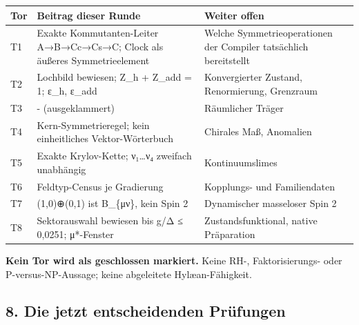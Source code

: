 {\def\LTcaptype{none} %
\begin{longtable}[]{@{}
  >{\raggedright\arraybackslash}p{}
  >{\raggedright\arraybackslash}p{}
  >{\raggedright\arraybackslash}p{}@{}}
\toprule\noalign{}
\begin{minipage}[b]{\linewidth}\raggedright
Tor
\end{minipage} & \begin{minipage}[b]{\linewidth}\raggedright
Beitrag dieser Runde
\end{minipage} & \begin{minipage}[b]{\linewidth}\raggedright
Weiter offen
\end{minipage} \\
\midrule\noalign{}
\endhead
\bottomrule\noalign{}
\endlastfoot
T1 & Exakte Kommutanten-Leiter A→B→Cc→Cs→C; Clock als äußeres
Symmetrieelement & Welche Symmetrieoperationen der Compiler tatsächlich
bereitstellt \\
T2 & Lochbild bewiesen; Z\_h + Z\_add = 1; ε\_h, ε\_add & Konvergierter
Zustand, Renormierung, Grenzraum \\
T3 & - (ausgeklammert) & Räumlicher Träger \\
T4 & Kern-Symmetrieregel; kein einheitliches Vektor-Wörterbuch &
Chirales Maß, Anomalien \\
T5 & Exakte Krylov-Kette; ν₁\ldots ν₄ zweifach unabhängig &
Kontinuumslimes \\
T6 & Feldtyp-Census je Gradierung & Kopplungs- und Familiendaten \\
T7 & (1,0)⊕\allowbreak{}(0,1) ist B\_\{μν\}, kein Spin 2 & Dynamischer masseloser
Spin 2 \\
T8 & Sektorauswahl bewiesen bis g/Δ ≤ 0,0251; μ*-Fenster &
Zustandsfunktional, native Präparation \\
\end{longtable}
}

\textbf{Kein Tor wird als geschlossen markiert.} Keine RH-,
Faktorisierungs- oder P-versus-NP-Aussage; keine abgeleitete
Hylæan-Fähigkeit.

\subsection{8. Die jetzt entscheidenden
Prüfungen}\label{die-jetzt-entscheidenden-pruxfcfungen}

